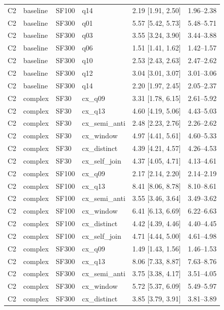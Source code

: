 \begin{longtable}{lllllr}
C2 & baseline & SF100 & q14 & 2.19 [1.91, 2.50] & 1.96--2.38 \\
C2 & baseline & SF300 & q01 & 5.57 [5.42, 5.73] & 5.48--5.71 \\
C2 & baseline & SF300 & q03 & 3.55 [3.24, 3.90] & 3.44--3.88 \\
C2 & baseline & SF300 & q06 & 1.51 [1.41, 1.62] & 1.42--1.57 \\
C2 & baseline & SF300 & q10 & 2.53 [2.43, 2.63] & 2.47--2.62 \\
C2 & baseline & SF300 & q12 & 3.04 [3.01, 3.07] & 3.01--3.06 \\
C2 & baseline & SF300 & q14 & 2.20 [1.97, 2.45] & 2.05--2.37 \\
C2 & complex & SF30 & cx\_q09 & 3.31 [1.78, 6.15] & 2.61--5.92 \\
C2 & complex & SF30 & cx\_q13 & 4.60 [4.19, 5.06] & 4.43--5.03 \\
C2 & complex & SF30 & cx\_semi\_anti & 2.48 [2.23, 2.76] & 2.26--2.62 \\
C2 & complex & SF30 & cx\_window & 4.97 [4.41, 5.61] & 4.60--5.33 \\
C2 & complex & SF30 & cx\_distinct & 4.39 [4.21, 4.57] & 4.26--4.53 \\
C2 & complex & SF30 & cx\_self\_join & 4.37 [4.05, 4.71] & 4.13--4.61 \\
C2 & complex & SF100 & cx\_q09 & 2.17 [2.14, 2.20] & 2.14--2.19 \\
C2 & complex & SF100 & cx\_q13 & 8.41 [8.06, 8.78] & 8.10--8.61 \\
C2 & complex & SF100 & cx\_semi\_anti & 3.55 [3.46, 3.64] & 3.49--3.62 \\
C2 & complex & SF100 & cx\_window & 6.41 [6.13, 6.69] & 6.22--6.63 \\
C2 & complex & SF100 & cx\_distinct & 4.42 [4.39, 4.46] & 4.40--4.45 \\
C2 & complex & SF100 & cx\_self\_join & 4.71 [4.44, 5.00] & 4.61--4.98 \\
C2 & complex & SF300 & cx\_q09 & 1.49 [1.43, 1.56] & 1.46--1.53 \\
C2 & complex & SF300 & cx\_q13 & 8.06 [7.33, 8.87] & 7.63--8.76 \\
C2 & complex & SF300 & cx\_semi\_anti & 3.75 [3.38, 4.17] & 3.51--4.05 \\
C2 & complex & SF300 & cx\_window & 5.72 [5.37, 6.09] & 5.49--5.97 \\
C2 & complex & SF300 & cx\_distinct & 3.85 [3.79, 3.91] & 3.81--3.89 \\

\end{longtable}
